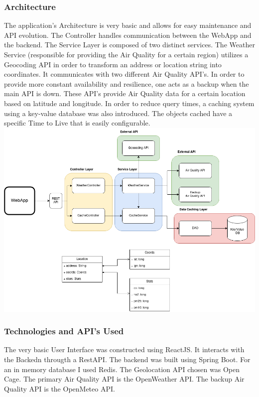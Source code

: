 \documentclass[12pt]{article}
\begin{document}
\subsubsection{Architecture}
The application's Architecture is very basic and allows for easy maintenance and API evolution. The Controller handles communication between the WebApp and the backend. The Service Layer is composed of two distinct services. The Weather Service (responsible for providing the Air Quality for a certain region) utilizes a Geocoding API in order to transform an address or location string into coordinates. It communicates with two different Air Quality API's. In order to provide more constant availability and resilience, one acts as a backup when the main API is down. These API's provide Air Quality data for a certain location based on latitude and longitude.
In order to reduce query times, a caching system using a key-value database was also introduced. The objects cached have a specific Time to Live that is easily configurable.
\includegraphics[scale=.4]{architecture.png}

\subsubsection{Technologies and API's Used}

The very basic User Interface was constructed using ReactJS. It interacts with the Backedn througth a RestAPI. The backend was built using Spring Boot. For an in memory database I used Redis. The Geolocation API chosen was Open Cage. The primary Air Quality API is the OpenWeather API. The backup Air Quality API is the OpenMeteo API.
\end{document}
